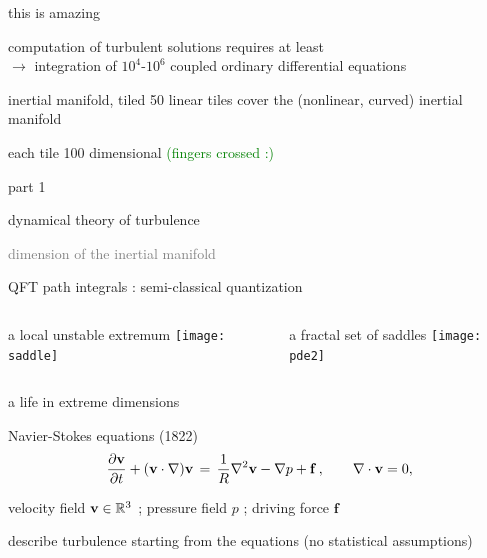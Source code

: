 \begin{frame}{this is amazing}
            \begin{block}{computation of turbulent solutions}
requires at least
\\
$\to$ integration of  $10^4$-$10^6$ coupled ordinary differential equations
            \end{block}

\bigskip

\begin{block}{inertial manifold, tiled}
50 linear tiles cover the (nonlinear, curved) inertial manifold

\medskip

each tile 100 dimensional \hfill \textcolor{green}{\small (fingers crossed :)}
            \end{block}
\end{frame}


\begin{frame}{part 1}
\begin{enumerate}
              \item {\Large
dynamical theory of turbulence
                  }\textcolor{gray}{\small
              \item
\statesp
             \item
dimension of the inertial manifold
                    }
            \end{enumerate}
\end{frame}

\begin{frame}{QFT path integrals : semi-classical quantization}
  \begin{columns}
\begin{block}{a local unstable extremum}
\texttt{[image: saddle]}%
\end{block}
\begin{block}{a fractal set of saddles}
\texttt{[image: pde2]}%
\end{block}
  \end{columns}
\end{frame}


\begin{frame}{a life in extreme dimensions}
\begin{block}{Navier-Stokes equations (1822)}
\[
\dfrac{\partial {\bf v}}{\partial t} + ({\bf v} \cdot \nabla) {\bf v}
	\,=\,
\frac{1}{R} \nabla ^2 {\bf v}
-\nabla p
+ \mathbf{f}
    \,,\qquad
\nabla \cdot {\bf v} = 0,
\]
\end{block}

\hfill{\small
velocity field  ${\bf v} \in \mathbb{R}^3$
;
pressure field $p$
;
driving force $\mathbf{f}$
        }

\medskip

\begin{block}{describe turbulence}
starting from the equations (no statistical assumptions)
\end{block}

\bigskip

\hfill {\Large\textcolor{red}{}}

\end{frame}

